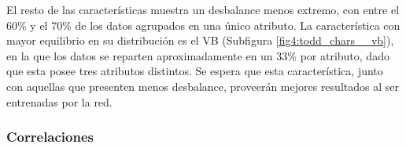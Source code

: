 \begin{figure}[p]
\end{figure}

El resto de las características muestra un desbalance menos extremo, con entre el 60\% y el 70\% de los datos agrupados en una único atributo. La característica con mayor equilibrio en su distribución es el VB (Subfigura \ref{fig4:todd_chars__vb}), en la que los datos se reparten aproximadamente en un 33\% por atributo, dado que esta posee tres atributos distintos. Se espera que esta característica, junto con aquellas que presenten menos desbalance, proveerán mejores resultados al ser entrenadas por la red.

\subsubsection{Correlaciones}

